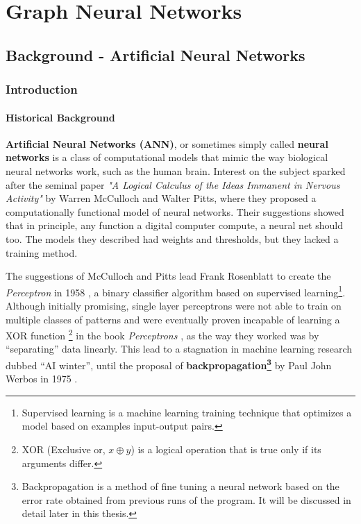 \chapter{Graph Neural Networks} \label{literature}

\section{Background - Artificial Neural Networks}

\subsection{Introduction}

\subsubsection{Historical Background}

\textbf{Artificial Neural Networks (ANN)}, or sometimes simply called
\textbf{neural networks} is a class of computational models that mimic
the way biological neural networks work, such as the human brain. Interest
on the subject sparked after the seminal paper \textit{"A Logical
Calculus of the Ideas Immanent in Nervous Activity"}
\cite{article:McCulloch1943} by Warren McCulloch and Walter Pitts, where
they proposed a computationally functional model of neural networks.
Their suggestions showed that in principle, any function a digital computer
compute, a neural net should too. The models they described had weights
and thresholds, but they lacked a training method. 

The suggestions of McCulloch and Pitts lead Frank Rosenblatt to create
the \textit{Perceptron} in 1958 \cite{article:Rosenblatt1958ThePa}, a
binary classifier algorithm based on supervised
learning\footnote{Supervised learning is a machine learning training
technique that optimizes a model based on examples input-output
pairs.}. Although initially promising, single layer perceptrons were
not able to train on multiple classes of patterns and were eventually
proven incapable of learning a XOR function \footnote{XOR (Exclusive
or, $x\oplus y$) is a logical operation that is true only if its
arguments differ.} in the book \textit{Perceptrons}
\cite{book:minsky1969perceptrons}, as the way they worked was by
``separating'' data linearly. This lead to a stagnation in machine
learning research dubbed ``AI winter'', until the proposal of
\textbf{backpropagation\footnote{Backpropagation is a method of fine
tuning a neural network based on the error rate obtained from previous
runs of the program. It will be discussed in detail later in this
thesis.}} by Paul John Werbos in 1975 \cite{book:werbos1975beyond}.

